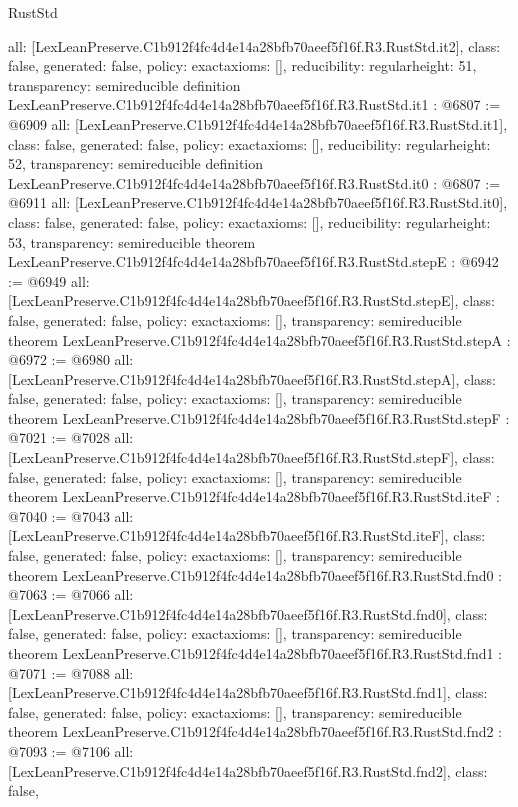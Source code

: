 \begin{lexlean}{RustStd}
\begin{coremodule}
{  all: [LexLeanPreserve.C1b912f4fc4d4e14a28bfb70aeef5f16f.R3.RustStd.it2],
  class: false,
  generated: false,
  policy: exact{axioms: []},
  reducibility: regular{height: 51},
  transparency: semireducible
}
definition LexLeanPreserve.C1b912f4fc4d4e14a28bfb70aeef5f16f.R3.RustStd.it1 : @6807 := @6909 {
  all: [LexLeanPreserve.C1b912f4fc4d4e14a28bfb70aeef5f16f.R3.RustStd.it1],
  class: false,
  generated: false,
  policy: exact{axioms: []},
  reducibility: regular{height: 52},
  transparency: semireducible
}
definition LexLeanPreserve.C1b912f4fc4d4e14a28bfb70aeef5f16f.R3.RustStd.it0 : @6807 := @6911 {
  all: [LexLeanPreserve.C1b912f4fc4d4e14a28bfb70aeef5f16f.R3.RustStd.it0],
  class: false,
  generated: false,
  policy: exact{axioms: []},
  reducibility: regular{height: 53},
  transparency: semireducible
}
theorem LexLeanPreserve.C1b912f4fc4d4e14a28bfb70aeef5f16f.R3.RustStd.stepE : @6942 := @6949 {
  all: [LexLeanPreserve.C1b912f4fc4d4e14a28bfb70aeef5f16f.R3.RustStd.stepE],
  class: false,
  generated: false,
  policy: exact{axioms: []},
  transparency: semireducible
}
theorem LexLeanPreserve.C1b912f4fc4d4e14a28bfb70aeef5f16f.R3.RustStd.stepA : @6972 := @6980 {
  all: [LexLeanPreserve.C1b912f4fc4d4e14a28bfb70aeef5f16f.R3.RustStd.stepA],
  class: false,
  generated: false,
  policy: exact{axioms: []},
  transparency: semireducible
}
theorem LexLeanPreserve.C1b912f4fc4d4e14a28bfb70aeef5f16f.R3.RustStd.stepF : @7021 := @7028 {
  all: [LexLeanPreserve.C1b912f4fc4d4e14a28bfb70aeef5f16f.R3.RustStd.stepF],
  class: false,
  generated: false,
  policy: exact{axioms: []},
  transparency: semireducible
}
theorem LexLeanPreserve.C1b912f4fc4d4e14a28bfb70aeef5f16f.R3.RustStd.iteF : @7040 := @7043 {
  all: [LexLeanPreserve.C1b912f4fc4d4e14a28bfb70aeef5f16f.R3.RustStd.iteF],
  class: false,
  generated: false,
  policy: exact{axioms: []},
  transparency: semireducible
}
theorem LexLeanPreserve.C1b912f4fc4d4e14a28bfb70aeef5f16f.R3.RustStd.fnd0 : @7063 := @7066 {
  all: [LexLeanPreserve.C1b912f4fc4d4e14a28bfb70aeef5f16f.R3.RustStd.fnd0],
  class: false,
  generated: false,
  policy: exact{axioms: []},
  transparency: semireducible
}
theorem LexLeanPreserve.C1b912f4fc4d4e14a28bfb70aeef5f16f.R3.RustStd.fnd1 : @7071 := @7088 {
  all: [LexLeanPreserve.C1b912f4fc4d4e14a28bfb70aeef5f16f.R3.RustStd.fnd1],
  class: false,
  generated: false,
  policy: exact{axioms: []},
  transparency: semireducible
}
theorem LexLeanPreserve.C1b912f4fc4d4e14a28bfb70aeef5f16f.R3.RustStd.fnd2 : @7093 := @7106 {
  all: [LexLeanPreserve.C1b912f4fc4d4e14a28bfb70aeef5f16f.R3.RustStd.fnd2],
  class: false,
}
\end{coremodule}
\end{lexlean}
